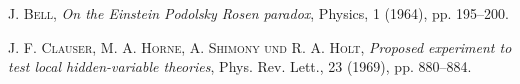 \documentclass[a4paper,10pt]{article}
\begin{document}
 \begin{thebibliography}{99}

     \textsc{J. Bell}, \textit{On the Einstein Podolsky Rosen paradox}, Physics, 1 (1964), pp. 195–200.

   \textsc{J. F. Clauser, M. A. Horne, A. Shimony und R. A. Holt}, \textit{Proposed experiment to
test local hidden-variable theories}, Phys. Rev. Lett., 23 (1969), pp. 880–884.

\end{thebibliography}
\end{document}

